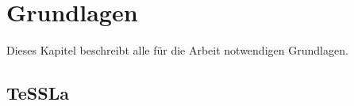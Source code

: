 
\chapter{Grundlagen}
\label{chapter-basics}

Dieses Kapitel beschreibt alle für die Arbeit notwendigen Grundlagen.

\section{TeSSLa}

